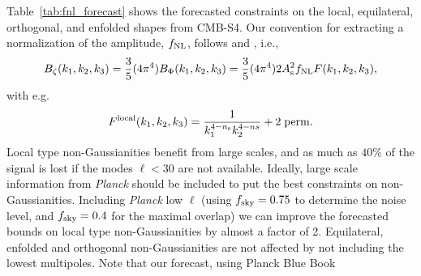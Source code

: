 
%
Table~\ref{tab:fnl_forecast} shows the forecasted constraints on the local, equilateral, orthogonal, and enfolded shapes from CMB-S4. Our convention for extracting a normalization of the amplitude, $f_{\rm NL}$, follows \cite{Babich:2004gb} and \cite{Ade:2013ydc}, i.e., 
\begin{equation}
B_{\zeta}(k_1,k_2,k_3) = \frac{3}{5} (4 \pi^4) B_{\Phi} (k_1,k_2,k_3) = \frac{3}{5} (4 \pi^4) 2 A_{\rm s}^2 f_{\rm NL} F(k_1,k_2,k_3) ,
\end{equation}
with e.g. 
\begin{equation}
F^{\rm local}(k_1,k_2,k_3) = \frac{1}{k_1^{4-n_{\rm s}}k_2^{4-ns}} + {\rm 2\;perm.}
\end{equation}
Local type non-Gaussianities benefit from large scales, and as much as $40\%$ of the signal is lost if the modes $\ell<30$ are not available. 
Ideally, large scale information from {\it Planck\/} \cite{Ade:2015ava} should be included to put the best constraints on non-Gaussianities. Including {\it Planck\/} low $\ell$ (using $f_{\rm sky} = 0.75$ \cite{Ade:2015ava} to determine the noise level, and $f_{\rm sky}=0.4$ for the maximal overlap) we can improve the forecasted bounds on local type non-Gaussianities by almost a factor of 2. Equilateral, enfolded and orthogonal non-Gaussianities are not affected by not including the lowest multipoles. Note that our forecast, using Planck Blue Book\cite{planck2005-bluebook}
